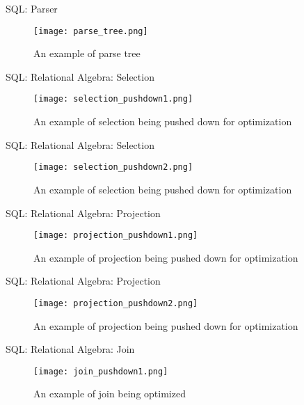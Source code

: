 \begin{frame}{SQL: Parser}
    \begin{figure}
        \centering
        \texttt{[image: parse\_tree.png]}\\
        \caption{An example of parse tree}
        \label{fig:prase_tree}
    \end{figure}
\end{frame}

\begin{frame}{SQL: Relational Algebra: Selection}
    \begin{figure}
        \centering
        \texttt{[image: selection\_pushdown1.png]}\\
        \caption{An example of selection being pushed down for optimization}
        \label{fig:s_p_1}
    \end{figure}
\end{frame}

\begin{frame}{SQL: Relational Algebra: Selection}
    \begin{figure}
        \centering
        \texttt{[image: selection\_pushdown2.png]}\\
        \caption{An example of selection being pushed down for optimization}
        \label{fig:s_p_2}
    \end{figure}
\end{frame}

\begin{frame}{SQL: Relational Algebra: Projection}
    \begin{figure}
        \centering
        \texttt{[image: projection\_pushdown1.png]}\\
        \caption{An example of projection being pushed down for optimization}
        \label{fig:p_p_1}
    \end{figure}
\end{frame}

\begin{frame}{SQL: Relational Algebra: Projection}
    \begin{figure}
        \centering
        \texttt{[image: projection\_pushdown2.png]}\\
        \caption{An example of projection being pushed down for optimization}
        \label{fig:p_p_2}
    \end{figure}
\end{frame}

\begin{frame}{SQL: Relational Algebra: Join}
    \begin{figure}
        \centering
        \texttt{[image: join\_pushdown1.png]}\\
        \caption{An example of join being optimized}
        \label{fig:j_1}
    \end{figure}
\end{frame}

